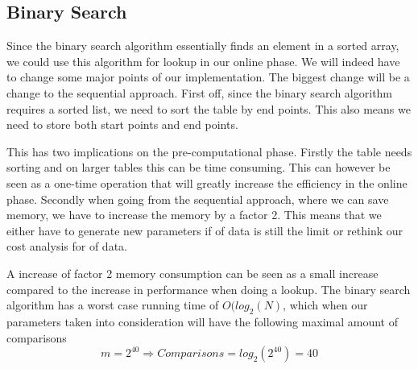 \subsection{Binary Search}

Since the binary search algorithm essentially finds an element in a
sorted array, we could use this algorithm for lookup in our
online phase. We will indeed have to change some major points of our
implementation. The biggest change will be a change to the sequential
approach. First off, since the binary search algorithm requires a
sorted list, we need to sort the table by end points. This also means
we need to store both start points and end points.

This has two implications on the pre-computational phase. Firstly the table
needs sorting and on larger tables this can be time consuming. This
can however be seen as a one-time operation that will greatly increase
the efficiency in the online phase. Secondly when going from the
sequential approach, where we can save memory, we have to 
increase the memory by a factor 2. This means that we either have to
generate new parameters if  of data is still the limit or
rethink our cost analysis for  of data.

A increase of factor 2 memory consumption can be seen as a small
increase compared to the increase in performance when doing a
lookup. The binary search algorithm has a worst case running time of
$O(log_2(N)$, which when our parameters taken into consideration will
have the following maximal amount of comparisons
\[m  = 2^{40} \Rightarrow Comparisons = log_2(2^{40}) = 40\]
